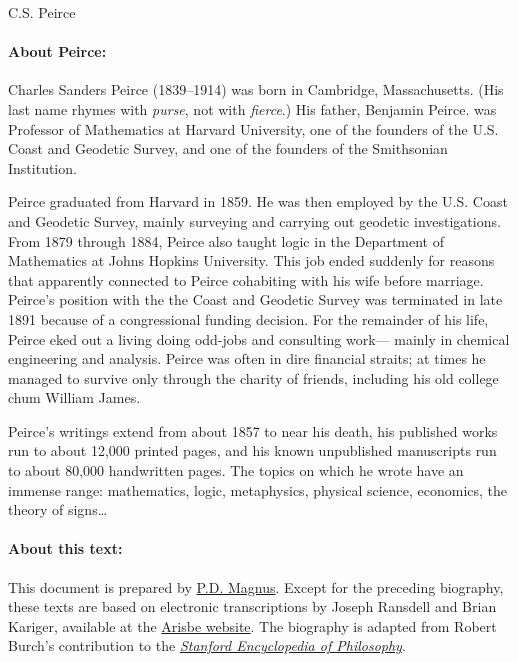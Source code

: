 \documentclass[]{article}
\newcommand*{\authortitle}[1]{\centerline{\Huge\sc #1}}
\begin{document}
\authortitle{C.S. Peirce}

\bigskip


\paragraph{About Peirce:}
Charles Sanders Peirce (1839--1914) was born in Cambridge,
Massachusetts. (His last name rhymes with \emph{purse}, not with \emph{fierce}.) His father, Benjamin Peirce. was Professor of Mathematics at
Harvard University, one of the founders of the U.S. Coast and
Geodetic Survey, and one of the founders of the Smithsonian
Institution.

Peirce graduated from Harvard in 1859. He was then
employed by the U.S. Coast and Geodetic Survey, mainly surveying and
carrying out geodetic investigations. From 1879 through 1884, Peirce
also taught logic in the Department of Mathematics at Johns Hopkins University. This job ended suddenly for reasons that
apparently connected to Peirce cohabiting with his wife before marriage. Peirce's position with the the Coast and Geodetic Survey was
terminated in late 1891 because of a congressional funding decision. For the remainder of his life, Peirce eked out a living doing odd-jobs and consulting work--- mainly in chemical engineering and analysis. Peirce was often in dire financial straits; at times he managed to survive only through the charity of friends, including his old college chum William James.

Peirce's writings extend from about 1857 to near his
death, his published works run to about 12,000 printed pages, and his known unpublished manuscripts run to about 80,000 handwritten pages. The topics on which he wrote have an immense range: mathematics, logic, metaphysics, physical science, economics, the theory of signs\ldots

\paragraph{About this text:}
This document is prepared by \href{https://www.fecundity.com}{P.D. Magnus}. Except for the preceding biography, these texts are based on electronic transcriptions by Joseph Ransdell and Brian Kariger, available at the \href{http://www.iupui.edu/~arisbe/}{Arisbe website}. The biography is adapted from Robert Burch's contribution to the \href{http://plato.stanford.edu}{\emph{Stanford Encyclopedia of Philosophy}}.
\end{document}
